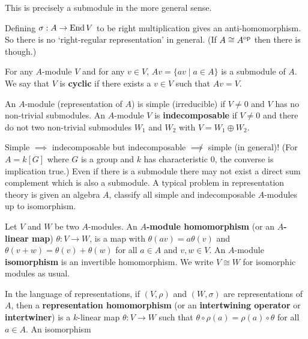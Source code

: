 \begin{rmk}
	This is precisely a submodule in the more general sense.
\end{rmk}

\begin{rmk}
	Defining $\sigma:A \to \operatorname{End} V$ to be right multiplication gives an anti-homomorphism.
	So there is no `right-regular representation' in general.
	(If $A \cong A^{\operatorname{op}}$ then there is though.)
\end{rmk}

\begin{defn}
	For any $A$-module $V$ and for any $v \in V$, $Av = \{av \mid a \in A\}$ is a submodule of $A$.
	We say that $V$ is \textbf{cyclic} if there exists a $v \in V$ such that $Av=V$.
\end{defn}

\begin{defn}
	An $A$-module (representation of $A$) is simple (irreducible) if $V \neq 0$ and $V$ has no non-trivial submodules.
	An $A$-module $V$ is \textbf{indecomposable} if $V \neq 0$ and there do not two non-trivial submodules $W_1$ and $W_2$ with $V = W_1 \oplus W_2$.
\end{defn}

\begin{rmk}
	Simple $\implies$ indecomposable but indecomposable $\not\implies$ simple (in general)!
	(For $A=k[G]$ where $G$ is a group and $k$ has characteristic $0$, the converse is implication true.)
	Even if there is a submodule there may not exist a direct sum complement which is also a submodule.
	A typical problem in representation theory is given an algebra $A$, classify all simple and indecomposable $A$-modules up to isomorphism.
\end{rmk}

\begin{defn}
	Let $V$ and $W$ be two $A$-modules.
	An \textbf{$A$-module homomorphism} (or an \textbf{$A$-linear map}) $\theta:V \to W$, is a map with \@ $\theta(av)=a\theta(v)$ and $\theta(v+w)=\theta(v)+\theta(w)$ for all $a \in A$ and $v,w \in V$.
	An $A$-module \textbf{isomorphism} is an invertible homomorphism.
	We write $V \cong W$ for isomorphic modules as usual.
	
	In the language of representations, if $(V,\rho)$ and $(W,\sigma)$ are representations of $A$, then a \textbf{representation homomorphism} (or an \textbf{intertwining operator} or \textbf{intertwiner}) is a $k$-linear map $\theta: V \to W$ such that $\theta \circ \rho(a) = \rho(a) \circ \theta$ for all $a \in A$.
	An isomorphism
\end{defn}

